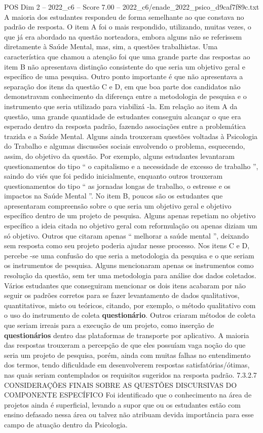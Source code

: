 \begin{textsample}{POS Dim 2 – 2022\_c6 – Score 7.00 – 2022\_c6/enade\_2022\_psico\_d9caf7f89c.txt}
A maioria dos estudantes respondeu de forma semelhante ao que constava no padrão de resposta.
O item A foi o mais respondido, utilizando, muitas vezes, o que já era abordado na questão norteadora, embora alguns não se referissem diretamente à Saúde Mental, mas, sim, a questões trabalhistas.
Uma característica que chamou a atenção foi que uma grande parte das respostas ao item B não apresentava distinção consistente do que seria um objetivo geral e específico de uma pesquisa.
Outro ponto importante é que não apresentava a separação dos itens da questão C e D, em que boa parte dos candidatos não demonstravam conhecimento da diferença entre a metodologia de pesquisa e o instrumento que seria utilizado para viabilizá -la.
Em relação ao item A da questão, uma grande quantidade de estudantes conseguiu alcançar o que era esperado dentro da resposta padrão, fazendo associações entre a problemática trazida e a Saúde Mental.
Alguns ainda trouxeram questões voltadas à Psicologia do Trabalho e algumas discussões sociais envolvendo o problema, esquecendo, assim, do objetivo da questão.
Por exemplo, alguns estudantes levantaram questionamentos do tipo “ o capitalismo e a necessidade de excesso de trabalho ”, saindo do viés que foi pedido inicialmente, enquanto outros trouxeram questionamentos do tipo “ as jornadas longas de trabalho, o estresse e os impactos na Saúde Mental ”.
No item B, poucos são os estudantes que apresentaram compreensão sobre o que seria um objetivo geral e objetivo específico dentro de um projeto de pesquisa.
Alguns apenas repetiam no objetivo específico a ideia citada no objetivo geral com reformulação ou apenas diziam um só objetivo.
Outros que citaram apenas “ melhorar a saúde mental ”, deixando sem resposta como seu projeto poderia ajudar nesse processo.
Nos itens C e D, percebe -se uma confusão do que seria a metodologia da pesquisa e o que seriam os instrumentos de pesquisa.
Alguns mencionaram apenas os instrumentos como resolução da questão, sem ter uma metodologia para análise dos dados coletados.
Vários estudantes que conseguiram mencionar os dois itens acabaram por não seguir os padrões corretos para se fazer levantamento de dados qualitativos, quantitativos, misto ou teóricos, citando, por exemplo, o método qualitativo com o uso do instrumento de coleta \textbf{questionário}.
Outros criaram métodos de coleta que seriam irreais para a execução de um projeto, como inserção de \textbf{questionários} dentro das plataformas de transporte por aplicativo.
A maioria das respostas trouxeram a percepção de que eles possuíam vaga noção do que seria um projeto de pesquisa, porém, ainda com muitas falhas no entendimento dos termos, tendo dificuldade em desenvolverem respostas satisfatórias/ótimas, nas quais seriam contemplados os requisitos sugeridos na resposta padrão. 7.3.2.7 CONSIDERAÇÕES FINAIS SOBRE AS QUESTÕES DISCURSIVAS DO COMPONENTE ESPECÍFICO Foi identificado que o conhecimento na área de projetos ainda é superficial, levando a supor que ou os estudantes estão com ensino defasado nessa área ou talvez não atribuam devida importância para esse campo de atuação dentro da Psicologia.

\end{textsample}
